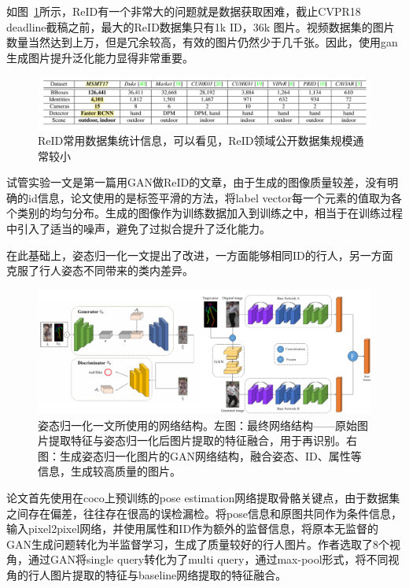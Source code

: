     如图~\ref{figure:dataset}所示，ReID有一个非常大的问题就是数据获取困难，截止CVPR18 deadline截稿之前，最大的ReID数据集只有1k ID，36k 图片。视频数据集的图片数量当然达到上万，但是冗余较高，有效的图片仍然少于几千张。因此，使用gan生成图片提升泛化能力显得非常重要。

    \begin{figure}[!htbp]
        \centering
        \includegraphics[width=\linewidth,keepaspectratio]{data/kaitibaogao/dataset.png}
        \caption{ReID常用数据集统计信息，可以看见，ReID领域公开数据集规模通常较小}
        \label{figure:dataset}
    \end{figure}

    试管实验一文\cite{zheng2017unlabeled}是第一篇用GAN做ReID的文章，由于生成的图像质量较差，没有明确的id信息，论文使用的是标签平滑的方法，将label vector每一个元素的值取为各个类别的均匀分布。生成的图像作为训练数据加入到训练之中，相当于在训练过程中引入了适当的噪声，避免了过拟合提升了泛化能力。
    
    在此基础上，姿态归一化一文\cite{qian2017pose}提出了改进，一方面能够相同ID的行人，另一方面克服了行人姿态不同带来的类内差异。

    \begin{figure}[!htbp]
        \centering
        \includegraphics[width=\linewidth,keepaspectratio]{data/kaitibaogao/pose-norm.png}
        \caption{姿态归一化一文\cite{qian2017pose}所使用的网络结构。左图：最终网络结构——原始图片提取特征与姿态归一化后图片提取的特征融合，用于再识别。右图：生成姿态归一化图片的GAN网络结构，融合姿态、ID、属性等信息，生成较高质量的图片。}
        \label{figure:pose-norm}
    \end{figure}

    论文首先使用在coco上预训练的pose estimation网络提取骨骼关键点，由于数据集之间存在偏差，往往存在很高的误检漏检。将pose信息和原图共同作为条件信息，输入pixel2pixel网络，并使用属性和ID作为额外的监督信息，将原本无监督的GAN生成问题转化为半监督学习，生成了质量较好的行人图片。作者选取了8个视角，通过GAN将single query转化为了multi query，通过max-pool形式，将不同视角的行人图片提取的特征与baseline网络提取的特征融合。

